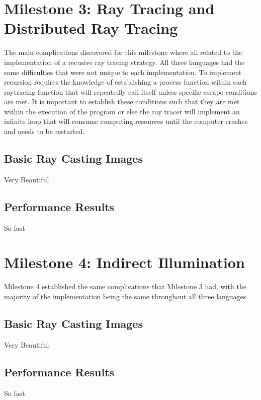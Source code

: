\section{Milestone 3: Ray Tracing and Distributed Ray Tracing}
The main complications discovered for this milestone where all related to the implementation of a recusive ray tracing strategy.  All three languages had the same difficulties that were not unique to each implementation.  To implement recursion requires the knowledge of establishing a process function within each raytracing function that will repeatedly call itself unless specific escape conditions are met.  It is important to establish these conditions such that they are met within the execution of the program or else the ray tracer will implement an infinite loop that will consume computing resources until the computer crashes and needs to be restarted.  

\subsection{Basic Ray Casting Images}
Very Beautiful
\subsection{Performance Results}
So fast

\section{Milestone 4: Indirect Illumination}
Milestone 4 established the same complications that Milestone 3 had, with the majority of the implementation being the same throughout all three languages.
\subsection{Basic Ray Casting Images}
Very Beautiful
\subsection{Performance Results}
So fast
